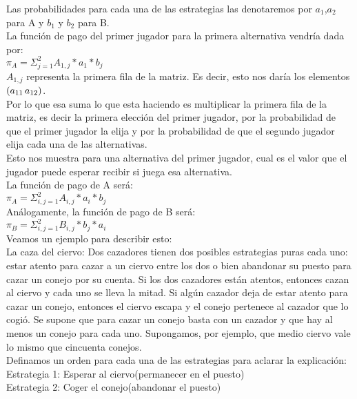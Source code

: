 \documentclass[10pt,a4paper]{book}
\begin{document}
Las probabilidades para cada una de las estrategias las denotaremos por $a_1$,$a_2$ para A y  $b_1$ y $b_2$ para B. \\
La función de pago del primer jugador para la primera alternativa vendría dada por:\\

$ \pi_A= \Sigma^{2}_{j=1} A_{1,j}*a_1*b_j$\\

$ A_{1,j}$ representa la primera fila de la matriz. Es decir, esto nos daría los elementos $(a_{11} \thinspace a_{12})$.\\
Por lo que esa suma lo que esta haciendo es multiplicar la primera fila de la matriz, es decir la primera elección del primer jugador, por la probabilidad de que el primer jugador la elija y por la probabilidad de que el segundo jugador elija cada una de las alternativas.\\
Esto nos muestra para una alternativa del primer jugador, cual es el valor que el jugador puede esperar recibir si juega esa alternativa.\\

La función de pago de A será:\\

$ \pi_A= \Sigma^{2}_{i,j=1} A_{i,j}*a_i*b_j$\\

Análogamente, la función de pago de B será:\\

$ \pi_B= \Sigma^{2}_{i,j=1} B_{i,j}*b_j*a_i$\\

Veamos un ejemplo para describir esto:\\

La caza del ciervo: Dos cazadores tienen dos posibles estrategias puras cada uno: estar atento para cazar a un ciervo entre los dos o bien abandonar su puesto para cazar un conejo por su cuenta. Si los dos cazadores están atentos, entonces cazan al ciervo y cada uno se lleva la mitad. Si algún cazador deja de estar atento para cazar un conejo, entonces el ciervo escapa y el conejo pertenece al cazador que lo cogió. Se supone que para cazar un conejo basta con un cazador y que hay al menos un conejo para cada uno. Supongamos, por ejemplo, que medio ciervo vale lo mismo que cincuenta conejos.\\

Definamos un orden para cada una de las estrategias para aclarar la explicación:\\
Estrategia 1: Esperar al ciervo(permanecer en el puesto)\\
Estrategia 2: Coger el conejo(abandonar el puesto)\\
\end{document}
